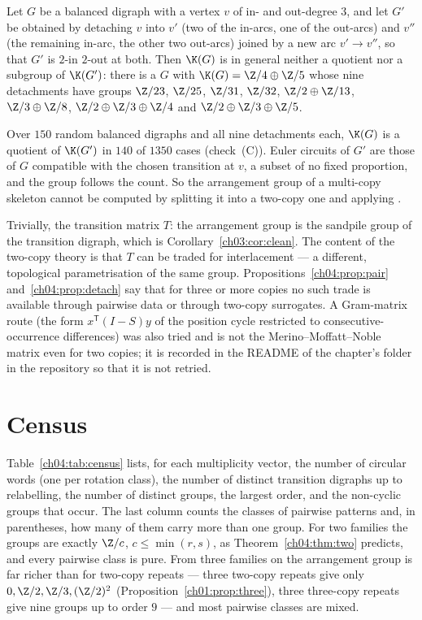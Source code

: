 \begin{proposition}\label{ch04:prop:detach}
Let $G$ be a balanced digraph with a vertex $v$ of in- and out-degree $3$, and let $G'$
be obtained by detaching $v$ into $v'$ (two of the in-arcs, one of the out-arcs) and
$v''$ (the remaining in-arc, the other two out-arcs) joined by a new arc $v'\to v''$, so
that $G'$ is $2$-in $2$-out at both. Then $\K(G)$ is in general neither a quotient nor a
subgroup of $\K(G')$: there is a $G$ with $\K(G)=\Z/4\oplus\Z/5$ whose nine detachments
have groups $\Z/23$, $\Z/25$, $\Z/31$, $\Z/32$, $\Z/2\oplus\Z/13$, $\Z/3\oplus\Z/8$,
$\Z/2\oplus\Z/3\oplus\Z/4$ and $\Z/2\oplus\Z/3\oplus\Z/5$.
\end{proposition}

Over $150$ random balanced digraphs and all nine detachments each, $\K(G)$ is a quotient
of $\K(G')$ in $140$ of $1350$ cases (check~(C)). Euler circuits of $G'$ are those of $G$
compatible with the chosen transition at $v$, a subset of no fixed proportion, and the
group follows the count. So the arrangement group of a multi-copy skeleton cannot be
computed by splitting it into a two-copy one and applying \cite{MMN}.

\begin{remark}
Trivially, the transition matrix $T$: the arrangement group is the sandpile group of the
transition digraph, which is Corollary~\ref{ch03:cor:clean}. The content of the two-copy theory is
that $T$ can be traded for interlacement --- a different, topological parametrisation of
the same group. Propositions~\ref{ch04:prop:pair} and~\ref{ch04:prop:detach} say that for three or
more copies no such trade is available through pairwise data or through two-copy
surrogates. A Gram-matrix route (the form $x^{\mathsf T}(I-S)y$ of the position cycle
restricted to consecutive-occurrence differences) was also tried and is not the
Merino--Moffatt--Noble matrix even for two copies; it is recorded in the README of the
chapter's folder in the repository so that it is not retried.
\end{remark}

\section{Census}\label{ch04:sec:census}

Table~\ref{ch04:tab:census} lists, for each multiplicity vector, the number of circular words
(one per rotation class), the number of distinct transition digraphs up to relabelling,
the number of distinct groups, the largest order, and the non-cyclic groups that occur.
The last column counts the classes of pairwise patterns and, in parentheses, how many of
them carry more than one group. For two families the groups are exactly $\Z/c$,
$c\le\min(r,s)$, as Theorem~\ref{ch04:thm:two} predicts, and every pairwise class is pure.
From three families on the arrangement group is far richer than for two-copy repeats
--- three two-copy repeats give only $0,\Z/2,\Z/3,(\Z/2)^{2}$ (Proposition~\ref{ch01:prop:three}),
three three-copy repeats give nine groups up to order $9$ --- and most pairwise classes
are mixed.

